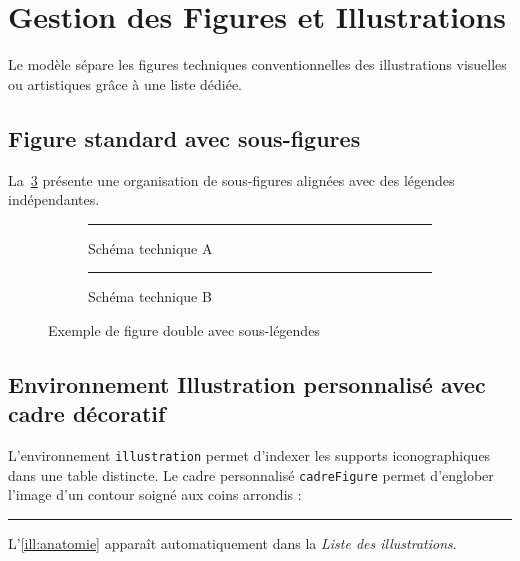 \section{Gestion des Figures et Illustrations}
\label{sec:illustrations}

Le modèle sépare les figures techniques conventionnelles des illustrations visuelles ou artistiques grâce à une liste dédiée.

\subsection{Figure standard avec sous-figures}
\label{subsec:figures_standards}

La~\cref{fig:exemple_figures} présente une organisation de sous-figures alignées avec des légendes indépendantes.

\begin{figure}[htbp]
  \centering
  \begin{subfigure}[b]{0.45\textwidth}
    \centering
    \rule{0.8\textwidth}{3cm}
    \caption{Schéma technique A}
    \label{subfig:schema_a}
  \end{subfigure}
  \hfill
  \begin{subfigure}[b]{0.45\textwidth}
    \centering
    \rule{0.8\textwidth}{3cm}
    \caption{Schéma technique B}
    \label{subfig:schema_b}
  \end{subfigure}
  \caption{Exemple de figure double avec sous-légendes}
  \label{fig:exemple_figures}
\end{figure}

\subsection{Environnement Illustration personnalisé avec cadre décoratif}
\label{subsec:illustrations_dediees}

L'environnement \texttt{illustration} permet d'indexer les supports iconographiques dans une table distincte.
Le cadre personnalisé \texttt{cadreFigure} permet d'englober l'image d'un contour soigné aux coins arrondis :

\begin{illustration}[htbp]
  \centering
  \begin{cadreFigure}[width=0.7\textwidth]
    \rule{7cm}{3.5cm}
  \end{cadreFigure}
  \caption{Représentation anatomique ou graphique d'expérimentation}
  \label{ill:anatomie}
\end{illustration}

L'\cref{ill:anatomie} apparaît automatiquement dans la \emph{Liste des illustrations}.
